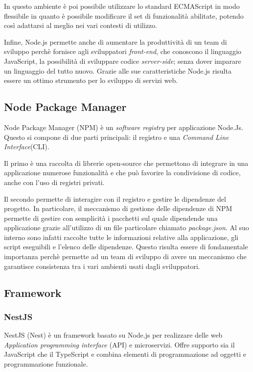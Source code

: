 In questo ambiente è poi possibile utilizzare lo standard ECMAScript in modo flessibile in quanto è possibile modificare il set di funzionalità abilitate,
potendo così adattarsi al meglio nei vari contesti di utilizzo.

Infine, Node.js permette anche di aumentare la produttività di un team di sviluppo perchè fornisce agli sviluppatori \textit{front-end},
che conoscono il linguaggio JavaScript, la possibilità di sviluppare codice \textit{server-side}; senza dover imparare un linguaggio del tutto nuovo.
Grazie alle sue caratteristiche Node.js risulta essere un ottimo strumento per lo sviluppo di servizi web.

\subsection{Node Package Manager}
Node Package Manager\cite{NPM} (NPM) è un \textit{software registry} per applicazione Node.Js.
Questo si compone di due parti principali: il registro e una \textit{Command Line Interface}(CLI).

Il primo è una raccolta di librerie open-source che permettono di integrare in una applicazione
numerose funzionalità e che può favorire la condivisione di codice, anche con l'uso di registri privati.

Il secondo permette di interagire con il registro e gestire le dipendenze del progetto.
In particolare, il meccanismo di gestione delle dipendenze di NPM permette di gestire con
semplicità i pacchetti sul quale dipendende una applicazione
grazie all'utilizzo di un file particolare chiamato \textit{package.json}. Al suo interno
sono infatti raccolte tutte le informazioni relative
alla applicazione, gli script eseguibili e l'elenco delle dipendenze.
Questo risulta essere di fondamentale importanza perchè permette ad un team di sviluppo di
avere un meccanismo che garantisce consistenza tra i vari ambienti usati dagli sviluppatori.


\subsection{Framework}
\subsubsection{NestJS}
NestJS \cite{NestJS} (Nest) è un framework basato su Node.js per realizzare delle web \textit{Application programming interface} (API) e microservizi.
Offre supporto sia il JavaScript che il TypeScript e combina elementi di programmazione ad oggetti e programmazione funzionale.

